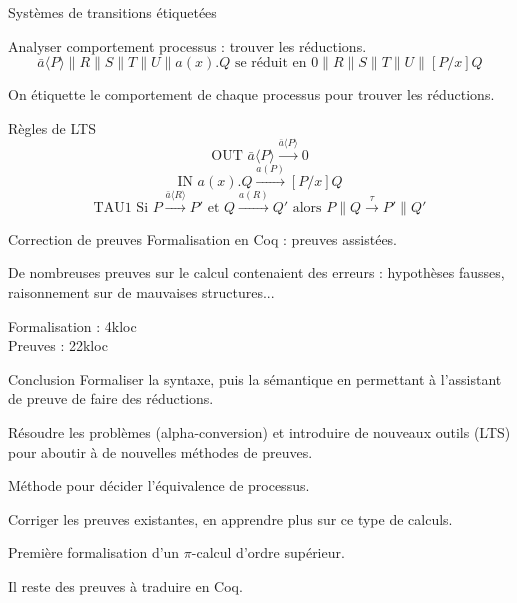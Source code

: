\documentclass{beamer}
\begin{document}
\begin{frame}{Systèmes de transitions étiquetées}

Analyser comportement processus : trouver les réductions.
$$\bar{a}\langle P\rangle\|R\|S\|T\|U\|a(x).Q \text{ se réduit en } 0\|R\|S\|T\|U\|[P/x]Q$$

On étiquette le comportement de chaque processus pour trouver les réductions.

\begin{block}{Règles de LTS}
$$\text{OUT } \bar{a}\langle P\rangle \overset{\bar{a}\langle P\rangle}{\longrightarrow} 0$$
$$\text{IN } a(x).Q \overset{a(P)}{\longrightarrow} [P/x]Q$$
$$\text{TAU1 Si } P\overset{\bar{a}\langle R\rangle}{\longrightarrow} P' \text{ et } Q\overset{a(R)}{\longrightarrow} Q' \text{ alors } P\|Q \overset{\tau}{\longrightarrow} P'\|Q'$$
\end{block}

\end{frame}

\begin{frame}{Correction de preuves}
Formalisation en Coq : preuves assistées.

De nombreuses preuves sur le calcul contenaient des erreurs : hypothèses fausses, raisonnement sur de mauvaises structures...

Formalisation : 4kloc\\
Preuves : 22kloc
\end{frame}

\begin{frame}{Conclusion}
Formaliser la syntaxe, puis la sémantique en permettant à l'assistant de preuve de faire des réductions.

Résoudre les problèmes (alpha-conversion) et introduire de nouveaux outils (LTS) pour aboutir à de nouvelles méthodes de preuves.

Méthode pour décider l'équivalence de processus.

Corriger les preuves existantes, en apprendre plus sur ce type de calculs.

Première formalisation d'un $\pi$-calcul d'ordre supérieur.

Il reste des preuves à traduire en Coq.
\end{frame}
\end{document}
